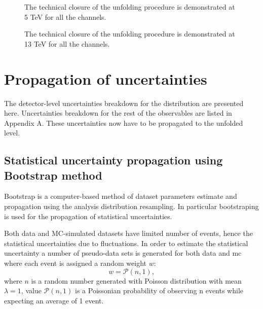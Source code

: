      \begin{figure}[pt]
	\caption{The technical closure of the unfolding procedure is demonstrated at 5 TeV for all the channels.}
	\label{fig:closure_plots_5Tev}
\end{figure}
     \begin{figure}[pt]
	\caption{The technical closure of the unfolding procedure is demonstrated at 13 TeV for all the channels.}
	\label{fig:closure_plots_13TeV}
\end{figure}
\section{Propagation of uncertainties}
The detector-level uncertainties breakdown for the \pt distribution are presented here. Uncertainties breakdown for the rest of the observables are listed in Appendix A. These uncertainties now have to be propagated to the unfolded level. 
\subsection{Statistical uncertainty propagation using Bootstrap method}
Bootstrap is a computer-based method of dataset parameters estimate and propagation using the analysis distribution resampling. In particular bootstraping is used for the propagation of statistical uncertainties. 

Both data and MC-simulated datasets have limited number of events, hence the statistical uncertainties due to fluctuations. In order to estimate the statistical uncertainty a number of pseudo-data sets is generated for both data and \gls{mc} where each event is assigned a random weight $w$:
\begin{equation}
w = \mathcal{P}(n,1),
\end{equation}
where $n$ is a random number generated with Poisson distribution with mean $\lambda=1$, value $\mathcal{P}(n,1)$ is a Poissonian probability of observing n events while expecting an average of 1 event.

